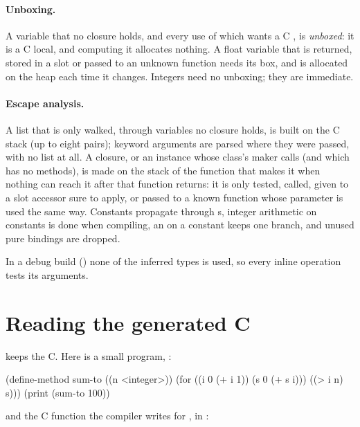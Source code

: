 \paragraph{Unboxing.} 
A  variable that no closure holds, and every use of
which wants a C , is \emph{unboxed}: it is a C
 local, and computing it allocates nothing. A float
variable that is returned, stored in a slot or passed to an unknown
function needs its box, and is allocated on the heap each time it
changes. Integers need no unboxing; they are immediate.

\paragraph{Escape analysis.} 
A  list that is only walked, through variables no closure
holds, is built on the C stack (up to eight pairs); keyword arguments
are parsed where they were passed, with no list at all. A closure, or an
instance whose class's maker  calls (and which has no
 methods), is made on the stack of the function that
makes it when nothing can reach it after that function returns: it is
only tested, called, given to a slot accessor sure to apply, or passed to
a known function whose parameter is used the same way. Constants
propagate through s, integer arithmetic on constants is done
when compiling, an  on a constant keeps one branch, and unused
pure bindings are dropped.

In a debug build () none of the inferred types is used, so every
inline operation tests its arguments.

\section{Reading the generated C}\label{sec:internals-reading}

 keeps the C. Here is a small program, :

\begin{dylan}
(define-method sum-to ((n <integer>))
  (for ((i 0 (+ i 1))
        (s 0 (+ s i)))
       ((> i n) s)))
(print (sum-to 100))
\end{dylan}

\noindent and the C function the compiler writes for , in
:

